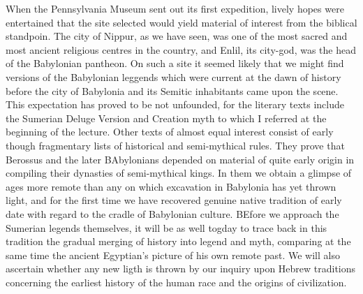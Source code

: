 \documentclass[12pt,oneside]{book}
\begin{document}
When the Pennsylvania Museum sent out its first expedition, lively hopes were entertained that the site selected would yield material of interest from the biblical standpoin. The city of Nippur, as we have seen, was one of the most sacred and most ancient religious centres in the country, and Enlil, its city-god, was the head of the Babylonian pantheon. On such a site it seemed likely that we might find versions of the Babylonian leggends which were current at the dawn of history before the city of Babylonia and its Semitic inhabitants came upon the scene. This expectation has proved to be not unfounded, for the literary texts include the Sumerian Deluge Version and Creation myth to which I referred at the beginning of the lecture. Other texts of almost equal interest consist of early though fragmentary lists of historical and semi-mythical rules. They prove that Berossus and the later BAbylonians depended on material of quite early origin in compiling their dynasties of semi-mythical kings. In them we obtain a glimpse of ages more remote than any on which excavation in Babylonia has yet thrown light, and for the first time we have recovered genuine native tradition of early date with regard to the cradle of Babylonian culture. BEfore we approach the Sumerian legends themselves, it will be as well togday to trace back in this tradition the gradual merging of history into legend and myth, comparing at the same time the ancient Egyptian's picture of his own remote past. We will also ascertain whether any new ligth is thrown by our inquiry upon Hebrew traditions concerning the earliest history of the human race and the origins of civilization. \par 
\end{document}
